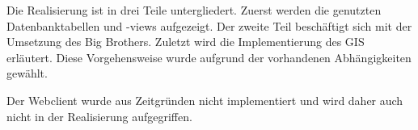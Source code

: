Die Realisierung ist in drei Teile untergliedert. Zuerst werden die genutzten Datenbanktabellen und -views aufgezeigt. Der zweite Teil beschäftigt sich mit der Umsetzung des Big Brothers. Zuletzt wird die Implementierung des GIS erläutert. Diese Vorgehensweise wurde aufgrund der vorhandenen Abhängigkeiten gewählt.

Der Webclient wurde aus Zeitgründen nicht implementiert und wird daher auch nicht in der Realisierung aufgegriffen.